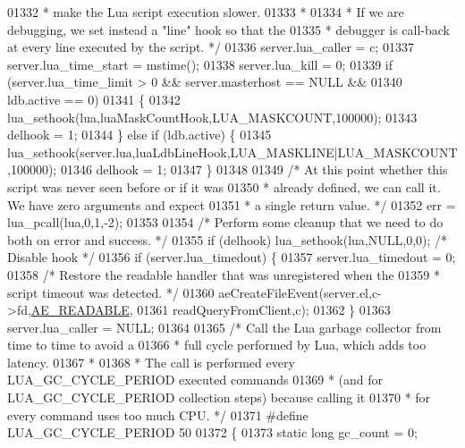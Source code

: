 \begin{DoxyCode}
{{{{{{{{{{{01332 \textcolor{comment}{     * make the Lua script execution slower.}
01333 \textcolor{comment}{     *}
01334 \textcolor{comment}{     * If we are debugging, we set instead a "line" hook so that the}
01335 \textcolor{comment}{     * debugger is call-back at every line executed by the script. */}
01336     server.lua\_caller = c;
01337     server.lua\_time\_start = mstime();
01338     server.lua\_kill = 0;
01339     \textcolor{keywordflow}{if} (server.lua\_time\_limit > 0 && server.masterhost == NULL &&
01340         ldb.active == 0)
01341     \{
01342         lua\_sethook(lua,luaMaskCountHook,LUA\_MASKCOUNT,100000);
01343         delhook = 1;
01344     \} \textcolor{keywordflow}{else} \textcolor{keywordflow}{if} (ldb.active) \{
01345         lua\_sethook(server.lua,luaLdbLineHook,LUA\_MASKLINE|LUA\_MASKCOUNT,100000);
01346         delhook = 1;
01347     \}
01348 
01349     \textcolor{comment}{/* At this point whether this script was never seen before or if it was}
01350 \textcolor{comment}{     * already defined, we can call it. We have zero arguments and expect}
01351 \textcolor{comment}{     * a single return value. */}
01352     err = lua\_pcall(lua,0,1,-2);
01353 
01354     \textcolor{comment}{/* Perform some cleanup that we need to do both on error and success. */}
01355     \textcolor{keywordflow}{if} (delhook) lua\_sethook(lua,NULL,0,0); \textcolor{comment}{/* Disable hook */}
01356     \textcolor{keywordflow}{if} (server.lua\_timedout) \{
01357         server.lua\_timedout = 0;
01358         \textcolor{comment}{/* Restore the readable handler that was unregistered when the}
01359 \textcolor{comment}{         * script timeout was detected. */}
01360         aeCreateFileEvent(server.el,c->fd,\hyperlink{ae_8h_a7a9a2162d007d09739955b4e55c65bf3}{AE\_READABLE},
01361                           readQueryFromClient,c);
01362     \}
01363     server.lua\_caller = NULL;
01364 
01365     \textcolor{comment}{/* Call the Lua garbage collector from time to time to avoid a}
01366 \textcolor{comment}{     * full cycle performed by Lua, which adds too latency.}
01367 \textcolor{comment}{     *}
01368 \textcolor{comment}{     * The call is performed every LUA\_GC\_CYCLE\_PERIOD executed commands}
01369 \textcolor{comment}{     * (and for LUA\_GC\_CYCLE\_PERIOD collection steps) because calling it}
01370 \textcolor{comment}{     * for every command uses too much CPU. */}
01371     \textcolor{preprocessor}{#}\textcolor{preprocessor}{define} \textcolor{preprocessor}{LUA\_GC\_CYCLE\_PERIOD} 50
01372     \{
01373         \textcolor{keyword}{static} \textcolor{keywordtype}{long} gc\_count = 0;
}}}}}}}}}}}
\end{DoxyCode}
